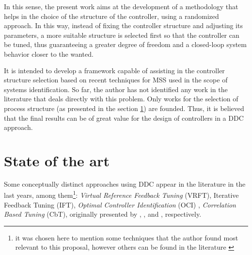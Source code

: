 In this sense, the present work aims at the development of a methodology that helps in the choice of the structure of the controller, using a randomized approach. In this way, instead of fixing the controller structure and adjusting its parameters, a more suitable structure is selected first so that the controller can be tuned, thus guaranteeing a greater degree of freedom and a closed-loop system behavior closer to the wanted.

It is intended to develop a framework capable of assisting in the controller structure selection based on recent techniques for MSS used in the scope of systems identification. So far, the author has not identified any work in the literature that deals directly with this problem. Only works for the selection of process structure (as presented in the section \ref{sec:state_of_the_art}) are founded.
Thus, it is believed that the final results can be of great value for the design of controllers in a DDC approach.




\section{State of the art}%
\label{sec:state_of_the_art}


Some conceptually distinct approaches using DDC appear in the literature in the last years, among them\footnote{it was chosen here to mention some techniques that the author found most relevant to this proposal, however others can be found in the literature \citep{spall1992, safonov1995, karimi2007, huang2008, schaal1994, shi2000}}:
\emph{Virtual Reference Feedback Tuning} (VRFT), Iterative Feedback Tuning (IFT), \emph{Optimal Controller Identification} (OCI) \citep{campestrini2017}, \emph{Correlation Based Tuning} (CbT), originally presented by \cite{campi2002}, \cite{hjalmarsson1994}, \cite{kammer2000} and \cite{karimi2002}, respectively.

